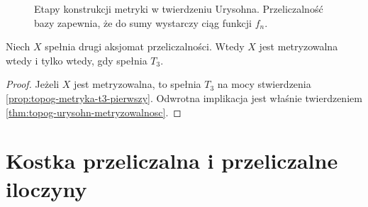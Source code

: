 \begin{figure}[htbp]
\centering
{}
\caption{Etapy konstrukcji metryki w twierdzeniu Urysohna.
Przeliczalność bazy zapewnia, że do sumy wystarczy
ciąg funkcji $f_n$.}
\label{fig:topog-urysohn-metryka-schemat}
\end{figure}

\begin{wniosek}
\label{cor:topog-drugi-metryzowalna-iff-t3}
Niech $X$ spełnia drugi aksjomat przeliczalności.
Wtedy $X$ jest metryzowalna wtedy i tylko wtedy, gdy
spełnia $T_3$.
\end{wniosek}
\begin{proof}
Jeżeli $X$ jest metryzowalna, to spełnia $T_3$
na mocy stwierdzenia \ref{prop:topog-metryka-t3-pierwszy}.
Odwrotna implikacja jest właśnie twierdzeniem
\ref{thm:topog-urysohn-metryzowalnosc}.
\end{proof}

\section{Kostka przeliczalna i przeliczalne iloczyny}
\label{sec:topog-metryzowalnosc-iloczyny}

